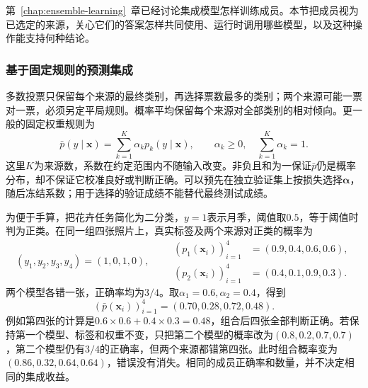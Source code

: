 第~\ref{chap:ensemble-learning}~章已经讨论集成模型怎样训练成员。本节把成员视为已选定的来源，关心它们的答案怎样共同使用、运行时调用哪些模型，以及这种操作能支持何种结论。

\subsubsection{基于固定规则的预测集成}
\label{sec:ket-integration-fixed-prediction}

多数投票只保留每个来源的最终类别，再选择票数最多的类别；两个来源可能一票对一票，必须另定平局规则。概率平均保留每个来源对全部类别的相对倾向。更一般的固定权重规则为
\begin{equation}
  \bar p(y\mid\bm{x})=\sum_{k=1}^{K}\alpha_k p_k(y\mid\bm{x}),
  \qquad \alpha_k\geq 0,\quad \sum_{k=1}^{K}\alpha_k=1.
  \label{eq:ket-integration-fixed-average}
\end{equation}
这里$K$为来源数，系数在约定范围内不随输入改变。非负且和为一保证$\bar p$仍是概率分布，却不保证它校准良好或判断正确。可以预先在独立验证集上按损失选择$\bm{\alpha}$，随后冻结系数；用于选择的验证成绩不能替代最终测试成绩。

\begin{example}[互补错误与共同错误]
  \label{ex:ket-integration-weighted-prediction}
  为便于手算，把花卉任务简化为二分类，$y=1$表示月季，阈值取$0.5$，等于阈值时判为正类。在同一组四张照片上，真实标签及两个来源对正类的概率为
  \[
    (y_1,y_2,y_3,y_4)=(1,0,1,0),\qquad
    \begin{aligned}
      (p_1(\bm{x}_i))_{i=1}^{4}&=(0.9,0.4,0.6,0.6),\\
      (p_2(\bm{x}_i))_{i=1}^{4}&=(0.4,0.1,0.9,0.3).
    \end{aligned}
  \]
  两个模型各错一张，正确率均为$3/4$。取$\alpha_1=0.6,\alpha_2=0.4$，得到
  \[
    (\bar p(\bm{x}_i))_{i=1}^{4}
    =(0.70,0.28,0.72,0.48).
  \]
  例如第四张的计算是$0.6\times0.6+0.4\times0.3=0.48$，组合后四张全部判断正确。若保持第一个模型、标签和权重不变，只把第二个模型的概率改为$(0.8,0.2,0.7,0.7)$，第二个模型仍有$3/4$的正确率，但两个来源都错第四张。此时组合概率变为$(0.86,0.32,0.64,0.64)$，错误没有消失。相同的成员正确率和数量，并不决定相同的集成收益。
\end{example}

